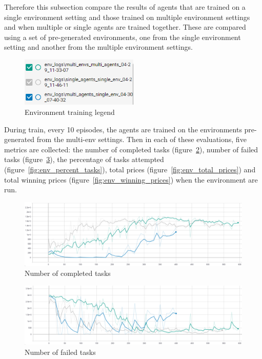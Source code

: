 Therefore this subsection compare the results of agents that are trained on a single environment setting and those
trained on multiple environment settings and when multiple or single agents are trained together.
These are compared using a set of pre-generated environments, one from the single environment setting and another from
the multiple environment settings.


\begin{figure}
    \includegraphics[width=0.5\textwidth]{figures/4_test_eval_figs/env_training_fig/legend.png}
    \caption{Environment training legend}
    \label{fig:env-training-legend}
\end{figure}

During train, every 10 episodes, the agents are trained on the environments pre-generated from the multi-env settings.
Then in each of these evaluations, five metrics are collected: the number of completed tasks
(figure~\ref{fig:env_num_completed_tasks}), number of failed tasks (figure~\ref{fig:env_num_failed_tasks}),
the percentage of tasks attempted (figure~\ref{fig:env_percent_tasks}), total prices (figure~\ref{fig:env_total_prices})
and total winning prices (figure~\ref{fig:env_winning_prices}) when the environment are run.

\begin{figure}[h]
    \centering
    \includegraphics[width=17cm]{figures/4_test_eval_figs/env_training_fig/num_completed_tasks.png}
    \caption{Number of completed tasks}
    \label{fig:env_num_completed_tasks}
\end{figure}

\begin{figure}[h]
    \centering
    \includegraphics[width=17cm]{figures/4_test_eval_figs/env_training_fig/num_failed_tasks.png}
    \caption{Number of failed tasks}
    \label{fig:env_num_failed_tasks}
\end{figure}

